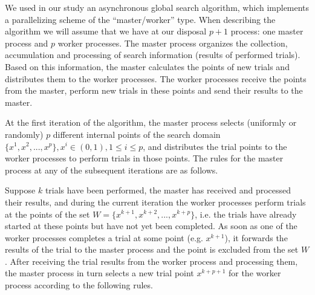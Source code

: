 \documentclass[runningheads]{llncs}
\begin{document}
We used in our study an asynchronous global search algorithm, which implements a parallelizing scheme of the ``master/worker'' type. When describing the algorithm we will assume that we have at our disposal $p+1$ process: one master process and $p$ worker processes. The master process organizes the collection, accumulation and processing of search information (results of performed trials). Based on this information, the master calculates the points of new trials and distributes them to the worker processes. The worker processes receive the points from the master, perform new trials in these points and send their results to the master.

At the first iteration of the algorithm, the master process selects (uniformly or randomly) $p$ different internal points of the search domain $\{x^1, x^2, ..., x^p\}, x^i \in (0,1), 1 \leq i \leq p$, and distributes the trial points to the worker processes to perform trials in those points. The rules for the master process at any of the subsequent iterations are as follows. 

Suppose $k$ trials have been performed, the master has received and processed their results, and during the current iteration the worker processes perform trials at the points of the set $W=\{x^{k+1}, x^{k+2},..., x^{k+p}\}$, i.e. the trials have already started at these points but have not yet been completed. As soon as one of the worker processes completes a trial at some point (e.g. $x^{k+1}$), it forwards the results of the trial to the master process and the point is excluded from the set $W$. After receiving the trial results from the worker process and processing them, the master process in turn selects a new trial point $x^{k+p+1}$ for the worker process according to the following rules.
\end{document}
